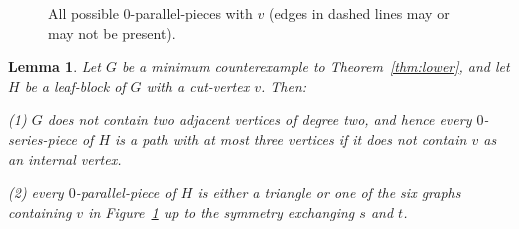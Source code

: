 \documentclass{article}
\newtheorem{lem}[thm]{Lemma}
\begin{document}
\begin{figure}[!htb]
\begin{center}
\caption{All possible 0-parallel-pieces with $v$ (edges in dashed lines may or may not be present).}\label{fig:0-parallel-piece}
\end{center}
\end{figure}   




\begin{lem}\label{lem:0-piece}
Let $G$ be a minimum counterexample to Theorem~\ref{thm:lower}, and let $H$ be a leaf-block of $G$ with a cut-vertex $v$. Then:

{\upshape (1)} $G$ does not contain two adjacent vertices of degree two, and hence every $0$-series-piece of $H$ is a path with at most three vertices if it does not contain $v$ as an internal vertex.

{\upshape (2)} every $0$-parallel-piece of $H$ is either a triangle or one of the six graphs containing $v$ in Figure~\ref{fig:0-parallel-piece} up to the symmetry exchanging $s$ and $t$. 
\end{lem}
\end{document}
